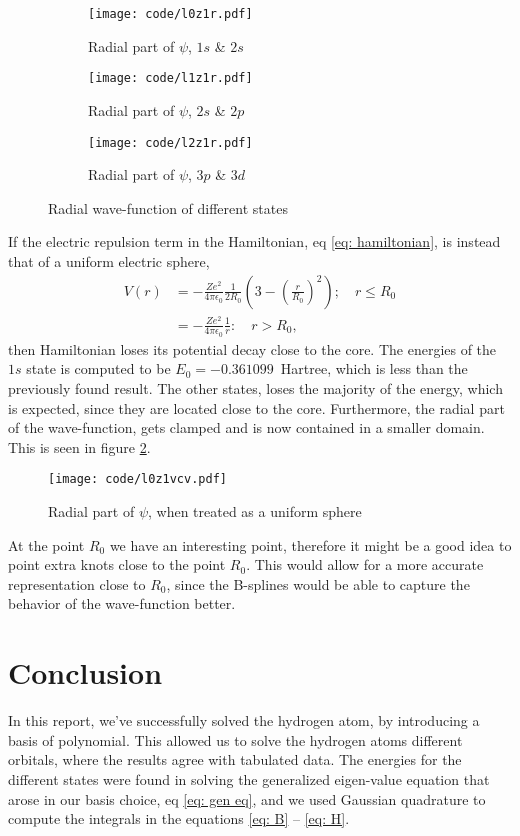 \documentclass[a4paper]{article}
\begin{document}
\begin{figure}[H]
    \centering
    \begin{subfigure}{0.3\textwidth}
        \texttt{[image: code/l0z1r.pdf]}
        \caption{Radial part of $\psi$, $1s$ \& $2s$}
    \end{subfigure}
    \hfill
    \begin{subfigure}{0.3\textwidth}
        \texttt{[image: code/l1z1r.pdf]}
        \caption{Radial part of $\psi$, $2s$ \& $2p$}
    
    \end{subfigure}
    \hfill
    \begin{subfigure}{0.3\textwidth}
        \texttt{[image: code/l2z1r.pdf]}
        \caption{Radial part of $\psi$, $3p$ \& $3d$}

    \end{subfigure}
    \caption{Radial wave-function of different states}
    \label{fig: radial wave-function}
\end{figure}\noindent
If the electric repulsion term in the Hamiltonian, eq \eqref{eq: hamiltonian}, is instead that of a uniform electric sphere,
\begin{align*}
    V(r) &= -\frac{Ze^2}{4\pi\epsilon_0} \frac{1}{2R_0}\left(3- \left(\frac{r}{R_0}\right)^2\right); \quad r\leq R_0\\
    &= -\frac{Ze^2}{4\pi\epsilon_0}\frac{1}{r}:\quad r> R_0,
\end{align*}then Hamiltonian loses its potential decay close to the core.
The energies of the $1s$ state is computed to be $E_0 = -0.361099$~Hartree, which is less than the previously found result.
The other states, loses the majority of the energy, which is expected, since they are located close to the core.
Furthermore, the radial part of the wave-function, gets clamped and is now contained in a smaller domain. This is seen in figure \ref{fig: mod pot}.
\begin{figure}[H]
    \centering
    \texttt{[image: code/l0z1vcv.pdf]}
    \caption{Radial part of $\psi$, when treated as a uniform sphere}
    \label{fig: mod pot}
\end{figure}\noindent
At the point $R_0$ we have an interesting point, therefore it might be a good idea to point extra knots close to the point $R_0$.
This would allow for a more accurate representation close to $R_0$, since the B-splines would be able to capture the behavior of the wave-function better.
\newpage

\section{Conclusion}
In this report, we've successfully solved the hydrogen atom, by introducing a basis of polynomial.
This allowed us to solve the hydrogen atoms different orbitals, where the results agree with tabulated data.
The energies for the different states were found in solving the generalized eigen-value equation that arose in our basis choice, eq \eqref{eq: gen eq},
and we used Gaussian quadrature to compute the integrals in the equations \eqref{eq: B} -- \eqref{eq: H}.
\end{document}
